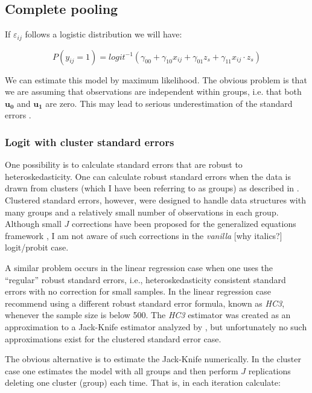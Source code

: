 \subsection{Complete pooling}

If $\varepsilon_{ij}$ follows a logistic distribution we will have:

\begin{equation}
P(y_{ij}=1)=logit^{-1}(\gamma_{00}+\gamma_{10} x_{ij}+\gamma_{01} z_s+\gamma_{11} x_{ij} \cdot z_s)
\end{equation}

We can estimate this model by maximum likelihood. The obvious problem is that we are assuming that observations are independent within groups, i.e. that both $\mathbf{u_{0}}$ and $\mathbf{u_{1}}$ are zero. This may lead to serious underestimation of the standard errors \citep{moulton:1990}.

\subsubsection{Logit with cluster standard errors}

One possibility is to calculate standard errors that are robust to heteroskedasticity. One can calculate robust standard errors when the data is drawn from clusters (which I have been referring to as groups) as described in \citep{wooldridge:2003}. Clustered standard errors, however, were designed to handle data structures with many groups and a relatively small number of observations in each group. Although small $J$ corrections have been proposed for the generalized equations framework \citep{murray:2004}, I am not aware of such corrections in the \textit{vanilla} [why italics?] logit/probit case.


A similar problem occurs in the linear regression case when one uses the ``regular'' robust standard errors, i.e., heteroskedasticity consistent standard errors with no correction for small samples.  In the  linear regression case \citet{long:2000} recommend using a different robust standard error formula, known as \emph{HC3}, whenever the sample size is below 500.  The \emph{HC3} estimator was created as an approximation to a Jack-Knife estimator analyzed by \citet{mackinnon:1985}, but unfortunately no such approximations exist for the clustered standard error case.

The obvious alternative is to estimate the Jack-Knife numerically. In the cluster case one estimates the model with all groups and then perform $J$ replications deleting one cluster (group) each time. That is, in each iteration calculate:

